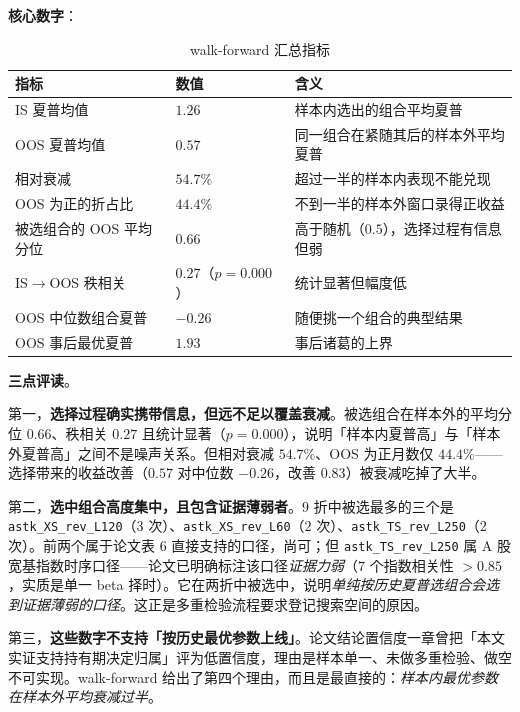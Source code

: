 \textbf{核心数字}：

\begin{table}[htbp]
\centering\footnotesize
\caption{walk-forward 汇总指标}\label{tab:wfsum}
\begin{tabular}{@{}>{\raggedright\arraybackslash}p{5.2cm}>{\raggedright\arraybackslash}p{2.4cm}>{\raggedright\arraybackslash}p{6.4cm}@{}}
\toprule
\textbf{指标} & \textbf{数值} & \textbf{含义} \\
\midrule
IS 夏普均值 & $1.26$ & 样本内选出的组合平均夏普 \\
OOS 夏普均值 & $0.57$ & 同一组合在紧随其后的样本外平均夏普 \\
相对衰减 & $54.7\%$ & 超过一半的样本内表现不能兑现 \\
OOS 为正的折占比 & $44.4\%$ & 不到一半的样本外窗口录得正收益 \\
被选组合的 OOS 平均分位 & $0.66$ & 高于随机（$0.5$），选择过程有信息但弱 \\
IS$\to$OOS 秩相关 & $0.27$（$p=0.000$） & 统计显著但幅度低 \\
OOS 中位数组合夏普 & $-0.26$ & 随便挑一个组合的典型结果 \\
OOS 事后最优夏普 & $1.93$ & 事后诸葛的上界 \\
\bottomrule
\end{tabular}
\end{table}

\textbf{三点评读}。

第一，\textbf{选择过程确实携带信息，但远不足以覆盖衰减}。被选组合在样本外的平均分位 $0.66$、秩相关 $0.27$ 且统计显著（$p=0.000$），说明「样本内夏普高」与「样本外夏普高」之间不是噪声关系。但相对衰减 $54.7\%$、OOS 为正月数仅 $44.4\%$——选择带来的收益改善（$0.57$ 对中位数 $-0.26$，改善 $0.83$）被衰减吃掉了大半。

第二，\textbf{选中组合高度集中，且包含证据薄弱者}。$9$ 折中被选最多的三个是 \texttt{astk\_XS\_rev\_L120}（$3$ 次）、\texttt{astk\_XS\_rev\_L60}（$2$ 次）、\texttt{astk\_TS\_rev\_L250}（$2$ 次）。前两个属于论文表 $6$ 直接支持的口径，尚可；但 \texttt{astk\_TS\_rev\_L250} 属 A 股宽基指数时序口径——论文已明确标注该口径\emph{证据力弱}（$7$ 个指数相关性 $>0.85$，实质是单一 beta 择时）。它在两折中被选中，说明\emph{单纯按历史夏普选组合会选到证据薄弱的口径}。这正是多重检验流程要求登记搜索空间的原因。

第三，\textbf{这些数字不支持「按历史最优参数上线」}。论文结论置信度一章曾把「本文实证支持持有期决定归属」评为低置信度，理由是样本单一、未做多重检验、做空不可实现。walk-forward 给出了第四个理由，而且是最直接的：\emph{样本内最优参数在样本外平均衰减过半}。

